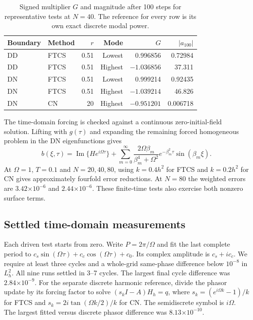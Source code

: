 \documentclass[11pt,a4paper]{article}
\newcommand{\sci}[2]{#1\mathord{\times}10^{#2}}
\begin{document}
\begin{table}[!ht]\centering
\caption{Signed multiplier $G$ and magnitude after 100 steps for representative tests at $N=40$. The reference for every row is its own exact discrete modal power.}
\begin{tabular}{@{}llrrrr@{}}\toprule
Boundary & Method & $r$ & Mode & $G$ & $|a_{100}|$ \\ \midrule
DD & FTCS & 0.51 & Lowest & 0.996856 & 0.72984 \\
DD & FTCS & 0.51 & Highest & $-1.036856$ & 37.311 \\
DN & FTCS & 0.51 & Lowest & 0.999214 & 0.92435 \\
DN & FTCS & 0.51 & Highest & $-1.039214$ & 46.826 \\
DN & CN & 20 & Highest & $-0.951201$ & 0.006718 \\
\bottomrule\end{tabular}
\end{table}

The time-domain forcing is checked against a continuous zero-initial-field solution. Lifting with $g(\tau)$ and expanding the remaining forced homogeneous problem in the DN eigenfunctions gives
\begin{equation}\label{eq:transient}
b(\xi,\tau)=\operatorname{Im}\{H e^{i\Omega\tau}\}+
\sum_{m=0}^\infty\frac{2\Omega\beta_m}{\beta_m^4+\Omega^2}e^{-\beta_m^2\tau}\sin(\beta_m\xi).
\end{equation}
At $\Omega=1$, $T=0.1$ and $N=20,40,80$, using $k=0.4h^2$ for FTCS and $k=0.2h^2$ for CN gives approximately fourfold error reductions. At $N=80$ the weighted errors are $\sci{3.42}{-6}$ and $\sci{2.44}{-6}$. These finite-time tests also exercise both nonzero surface terms.

\clearpage
\subsection{Settled time-domain measurements}
Each driven test starts from zero. Write $P=2\pi/\Omega$ and fit the last complete period to $c_s\sin(\Omega\tau)+c_c\cos(\Omega\tau)+c_0$. Its complex amplitude is $c_s+i c_c$. We require at least three cycles and a whole-grid same-phase difference below $10^{-8}$ in $L^2_h$. All nine runs settled in 3--7 cycles. The largest final cycle difference was $\sci{2.84}{-9}$. For the separate discrete harmonic reference, divide the phasor update by its forcing factor to solve $(s_k I-A)H_h=q$, where $s_k=(e^{i\Omega k}-1)/k$ for FTCS and $s_k=2i\tan(\Omega k/2)/k$ for CN. The semidiscrete symbol is $i\Omega$. The largest fitted versus discrete phasor difference was $\sci{8.13}{-10}$.
\end{document}
